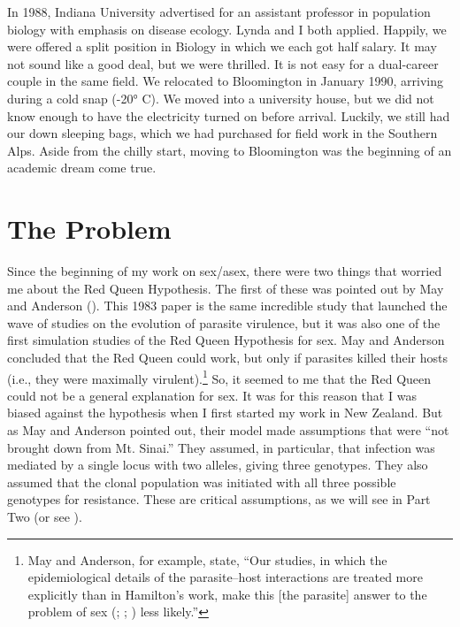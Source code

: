 \documentclass[
  letterpaper,
]{book}
\begin{document}
In 1988, Indiana University advertised for an assistant professor in
population biology with emphasis on disease ecology. Lynda and I both
applied. Happily, we were offered a split position in Biology in which
we each got half salary. It may not sound like a good deal, but we were
thrilled. It is not easy for a dual-career couple in the same field. We
relocated to Bloomington in January 1990, arriving during a cold snap
(-20° C). We moved into a university house, but we did not know enough
to have the electricity turned on before arrival. Luckily, we still had
our down sleeping bags, which we had purchased for field work in the
Southern Alps. Aside from the chilly start, moving to Bloomington was
the beginning of an academic dream come true.

\section{The Problem}\label{the-problem-1}

Since the beginning of my work on sex/asex, there were two things that
worried me about the Red Queen Hypothesis. The first of these was
pointed out by May and Anderson (). This
1983 paper is the same incredible study that launched the wave of
studies on the evolution of parasite virulence, but it was also one of
the first simulation studies of the Red Queen Hypothesis for sex. May
and Anderson concluded that the Red Queen could work, but only if
parasites killed their hosts (i.e., they were maximally
virulent).\footnote{May and Anderson, for example, state, ``Our studies,
  in which the epidemiological details of the parasite--host
  interactions are treated more explicitly than in Hamilton's work, make
  this {[}the parasite{]} answer to the problem of sex
  (;
  ;
  ) less likely.''} So, it
seemed to me that the Red Queen could not be a general explanation for
sex. It was for this reason that I was biased against the hypothesis
when I first started my work in New Zealand. But as May and Anderson
pointed out, their model made assumptions that were ``not brought down
from Mt. Sinai.'' They assumed, in particular, that infection was
mediated by a single locus with two alleles, giving three genotypes.
They also assumed that the clonal population was initiated with all
three possible genotypes for resistance. These are critical assumptions,
as we will see in Part Two (or see ).
\end{document}
